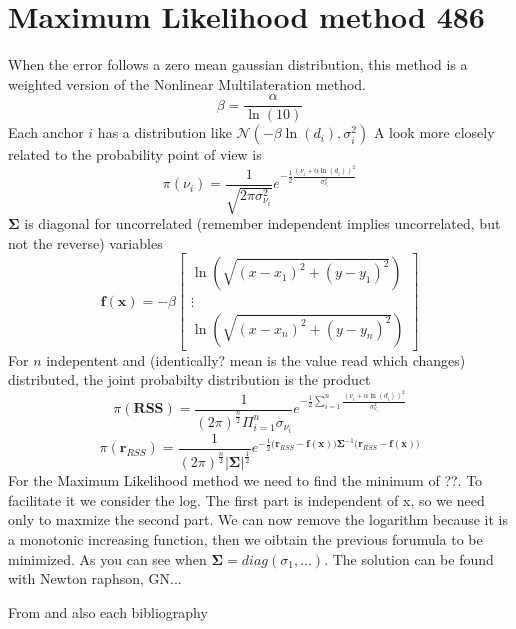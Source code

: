 \documentclass[12pt,twoside]{report}
\begin{document}
\section{Maximum Likelihood method 486}
When the error follows a zero mean gaussian distribution, this method is a weighted version of the Nonlinear Multilateration method. 
\begin{equation}
    \beta=\frac{\alpha}{\ln(10)}
\end{equation}
Each anchor $i$ has a distribution like $\mathcal{N}(-\beta\ln(d_i),\sigma^2_i)$
A look more closely related to the probability point of view is
\begin{equation}
    \pi(\nu_i)=\frac{1}{\sqrt{2\pi\sigma^2_{\nu_i}}}e^{-\frac{1}{2}\frac{(\nu_i+\alpha\ln(d_i))^2}{\sigma^2_{\nu_i}}}
\end{equation}
$\mathbf{\Sigma}$ is diagonal for uncorrelated (remember independent implies uncorrelated, but not the reverse) variables
$$\mathbf{f}(\mathbf{x})=-\beta\begin{bmatrix}
\ln(\sqrt{(x-x_1)^2+(y-y_1)^2})\\
\vdots\\
\ln(\sqrt{(x-x_n)^2+(y-y_n)^2})
\end{bmatrix}$$
For $n$ indepentent and (identically? mean is the value read which changes) distributed, the joint probabilty distribution is the product
\begin{equation}
    \pi(\mathbf{RSS})=\frac{1}{(2\pi)^{\frac{n}{2}}\Pi_{i=1}^n\sigma_{\nu_i}}e^{-\frac{1}{2}\sum_{i=1}^n\frac{(\nu_i+\alpha\ln(d_i))^2}{\sigma^2_{\nu_i}}}
\end{equation}
\begin{equation}
    \pi(\mathbf{r}_{RSS})=\frac{1}{(2\pi)^{\frac{n}{2}}|\mathbf{\Sigma}|^{\frac{1}{2}}}e^{-\frac{1}{2}\big(\mathbf{r}_{RSS}-\mathbf{f}(\mathbf{x})\big)\mathbf{\Sigma}^{-1}\big(\mathbf{r}_{RSS}-\mathbf{f}(\mathbf{x})\big)}
\end{equation}
For the Maximum Likelihood method we need to find the minimum of ??. To facilitate it we consider the log. The first part is independent of x, so we need only to maxmize the second part. We can now remove the logarithm because it is a monotonic increasing function, then we oibtain the previous forumula to be minimized. As you can see when $\mathbf{\Sigma}=diag{(\sigma_1,...)}$. The solution can be found with Newton raphson, GN...

\clearpage

From \cite{KAUR201982} and also each bibliography
\end{document}
